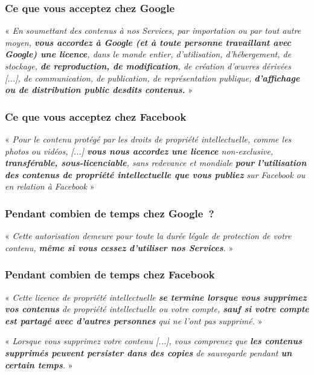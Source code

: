 \documentclass[notes=hide]{beamer}
\begin{document}
\begin{frame}[t]
		  \frametitle{\textcolor{titre}{Ce que vous acceptez chez Google}}
		  \vspace{4mm}
	   \begin{justify}
		   « \emph{En soumettant des contenus à nos Services, par importation ou par tout autre moyen, \textbf{vous accordez à Google (et à toute personne travaillant avec Google) une licence}, dans le monde entier, d'utilisation, d'hébergement, de stockage, \textbf{de reproduction, de modification}, de création d’œuvres dérivées [...], de communication, de publication, de représentation publique, \textbf{d'affichage ou de distribution public desdits contenus.}} »\\
			   \end{justify}
\end{frame}

\begin{frame}[t]
		  \frametitle{\textcolor{titre}{Ce que vous acceptez chez Facebook}}
		  \vspace{4mm}
\begin{justify}
						   « \emph{Pour le contenu protégé par les droits de propriété intellectuelle, comme les photos ou vidéos, [...] \textbf{vous nous accordez une licence} non-exclusive, \textbf{transférable, sous-licenciable}, sans redevance et mondiale \textbf{pour l'utilisation des contenus de propriété intellectuelle que vous publiez} sur Facebook ou en relation à Facebook} »
							   \end{justify}
								\end{frame}

\begin{frame}[t]
\frametitle{\textcolor{titre}{Pendant combien de temps chez Google~?}}
   \vspace{4mm}
		  \begin{justify}
		  « \emph{Cette autorisation demeure pour toute la durée légale de protection de votre contenu, \textbf{même si vous cessez d’utiliser nos Services}.} »
		  \end{justify}
	   \vspace{4mm}
\end{frame}

\begin{frame}[t]
\frametitle{\textcolor{titre}{Pendant combien de temps chez Facebook}}
		  \vfill
\begin{justify}
	   « \emph{Cette licence de propriété intellectuelle \textbf{se termine lorsque vous supprimez vos contenus} de propriété intellectuelle ou votre compte, \textbf{sauf si votre compte est partagé avec d'autres personnes} qui ne l'ont pas supprimé.} »\\
\end{justify}
\vfill
\begin{justify}
		   « \emph{Lorsque vous supprimez votre contenu [...], vous comprenez que \textbf{les contenus supprimés peuvent persister dans des copies} de sauvegarde pendant \textbf{un certain temps}.} »
\end{justify}
\end{frame}
\end{document}
